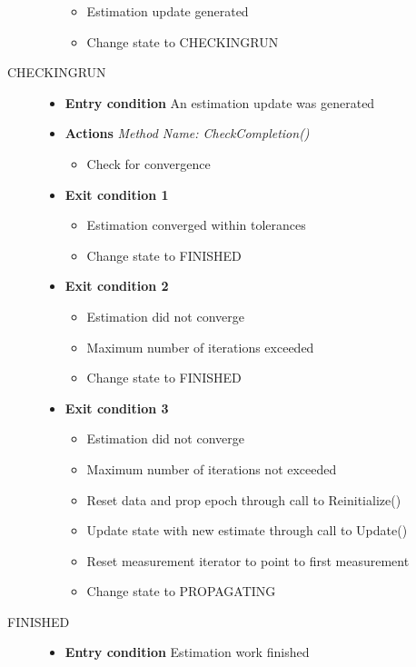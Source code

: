\begin{description}
\begin{itemize}
\begin{itemize}
\item Estimation update generated
\item Change state to CHECKINGRUN
\end{itemize}
\end{itemize}
\item[CHECKINGRUN]\hspace{1pt}
\begin{itemize}
\item \textbf{Entry condition} An estimation update was generated
\item \textbf{Actions} \textit{Method Name:  CheckCompletion()}
\begin{itemize}
\item Check for convergence
\end{itemize}
\item \textbf{Exit condition 1}
\begin{itemize}
\item Estimation converged within tolerances
\item Change state to FINISHED
\end{itemize}
\item \textbf{Exit condition 2}
\begin{itemize}
\item Estimation did not converge
\item Maximum number of iterations exceeded
\item Change state to FINISHED
\end{itemize}
\item \textbf{Exit condition 3}
\begin{itemize}
\item Estimation did not converge
\item Maximum number of iterations not exceeded
\item Reset data and prop epoch through call to Reinitialize()
\item Update state with new estimate through call to Update()
\item Reset measurement iterator to point to first measurement
\item Change state to PROPAGATING
\end{itemize}
\end{itemize}
\item[FINISHED]\hspace{1pt}
\begin{itemize}
\item \textbf{Entry condition}  Estimation work finished

\end{itemize}
\end{description}
